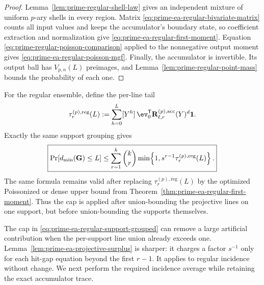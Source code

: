 \begin{proof}
Lemma~\ref{lem:prime-regular-shell-law} gives an independent mixture of
uniform $p$-ary shells in every region.  Matrix
\eqref{eq:prime-ea-regular-bivariate-matrix} counts all input values and keeps
the accumulator's boundary state, so coefficient extraction and normalization
give \eqref{eq:prime-ea-regular-first-moment}.  Equation
\eqref{eq:prime-regular-poisson-comparison} applied to the nonnegative output
moment gives \eqref{eq:prime-ea-regular-poisson-mgf}.  Finally, the accumulator
is invertible.  Its output ball has $V_{p,n}(L)$ preimages, and
Lemma~\ref{lem:prime-regular-point-mass} bounds the probability of each one.
\end{proof}

For the regular ensemble, define the per-line tail
\begin{equation}
 \tau^{(p),\mathrm{reg}}_r(L)
 :=\sum_{h=0}^L[Y^h]\,
   \ev_0^{\mathsf T}
   \mathbf R^{(p),\mathrm{acc}}_{\ell,r}(Y)^d\boldsymbol 1.
 \label{eq:prime-ea-regular-line-tail}
\end{equation}
Exactly the same support grouping gives
\begin{equation}
 \boxed{
 \Pr[d_{\min}(\mathbf G)\leq L]
 \leq
 \sum_{r=1}^k\binom{k}{r}
 \min\!\left\{1,
   s^{r-1}\tau^{(p),\mathrm{reg}}_r(L)
 \right\}.
 }
 \label{eq:prime-ea-regular-support-grouped}
\end{equation}
The same formula remains valid after replacing
$\tau^{(p),\mathrm{reg}}_r(L)$ by the optimized Poissonized or dense upper
bound from Theorem~\ref{thm:prime-ea-regular-first-moment}.  Thus the cap is
applied after union-bounding the projective lines on one support, but before
union-bounding the supports themselves.

The cap in \eqref{eq:prime-ea-regular-support-grouped} can remove a large
artificial contribution when the per-support line union already exceeds one.
Lemma~\ref{lem:prime-ea-projective-surplus} is sharper: it charges a factor
$s^{-1}$ only for each hit-gap equation beyond the first $r-1$.  It applies to
regular incidence without change.  We next perform the required incidence
average while retaining the exact accumulator trace.

